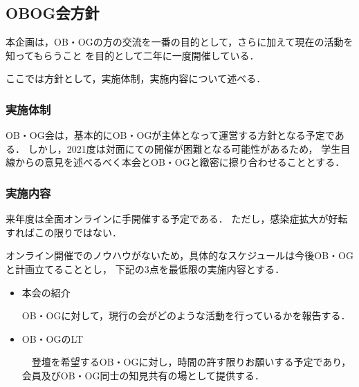 \subsection*{OBOG会方針}


本企画は，OB・OGの方の交流を一番の目的として，さらに加えて現在の活動を知ってもらうこと
を目的として二年に一度開催している．

ここでは方針として，実施体制，実施内容について述べる．

\subsubsection*{実施体制}

OB・OG会は，基本的にOB・OGが主体となって運営する方針となる予定である．
しかし，2021度は対面にての開催が困難となる可能性があるため，
学生目線からの意見を述べるべく本会とOB・OGと緻密に擦り合わせることとする．

\subsubsection*{実施内容}

来年度は全面オンラインに手開催する予定である．
ただし，感染症拡大が好転すればこの限りではない．

オンライン開催でのノウハウがないため，具体的なスケジュールは今後OB・OGと計画立てることとし，
下記の3点を最低限の実施内容とする．

\begin{itemize}
    \item 本会の紹介

        OB・OGに対して，現行の会がどのような活動を行っているかを報告する．
    \item OB・OGのLT

        　登壇を希望するOB・OGに対し，時間の許す限りお願いする予定であり，会員及びOB・OG同士の知見共有の場として提供する．
\end{itemize}

